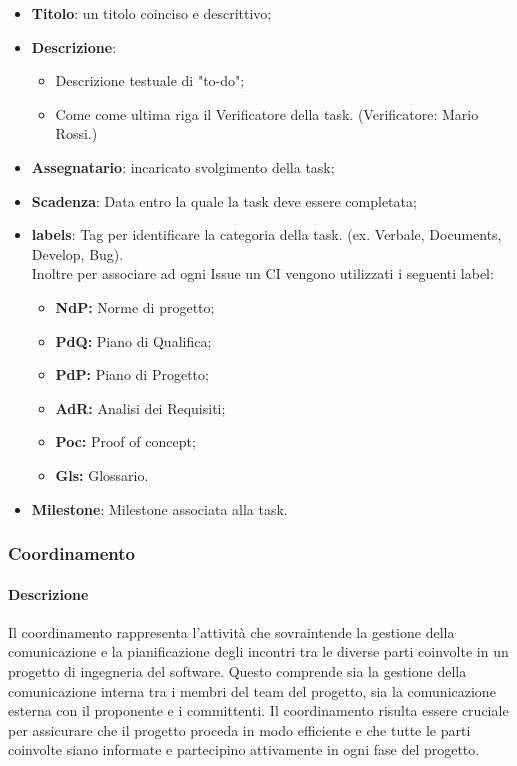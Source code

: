 \begin{itemize}
    \item \textbf{Titolo}: un titolo coinciso e descrittivo;
    \item \textbf{Descrizione}:
    \begin{itemize}
        \item Descrizione testuale di "to-do";
        \item Come come ultima riga il Verificatore della task. (Verificatore: Mario Rossi.)
    \end{itemize} 
    \item \textbf{Assegnatario}: incaricato svolgimento della task;
    \item \textbf{Scadenza}: Data entro la quale la task deve essere completata;
    \item \textbf{labels}: Tag per identificare la categoria della task. (ex. Verbale, Documents, Develop, Bug).\\ Inoltre per associare ad ogni Issue un CI vengono utilizzati i seguenti label:
    \begin{itemize}
        \item \textbf{NdP:} Norme di progetto;
        \item \textbf{PdQ:} Piano di Qualifica;
        \item \textbf{PdP:} Piano di Progetto;
        \item \textbf{AdR:} Analisi dei Requisiti;
        \item \textbf{Poc:} Proof of concept;
        \item \textbf{Gls:} Glossario.
    \end{itemize}
    \item \textbf{Milestone}: Milestone associata alla task.
\end{itemize}

\subsubsection{Coordinamento}

\paragraph{Descrizione}
Il coordinamento rappresenta l'attività che sovraintende la gestione della comunicazione e la pianificazione degli incontri tra le diverse parti coinvolte in un progetto di ingegneria del software. Questo comprende sia la gestione della comunicazione interna tra i membri del team del progetto, sia la comunicazione esterna con il proponente e i committenti. Il coordinamento risulta essere cruciale per assicurare che il progetto proceda in modo efficiente e che tutte le parti coinvolte siano informate e partecipino attivamente in ogni fase del progetto.
